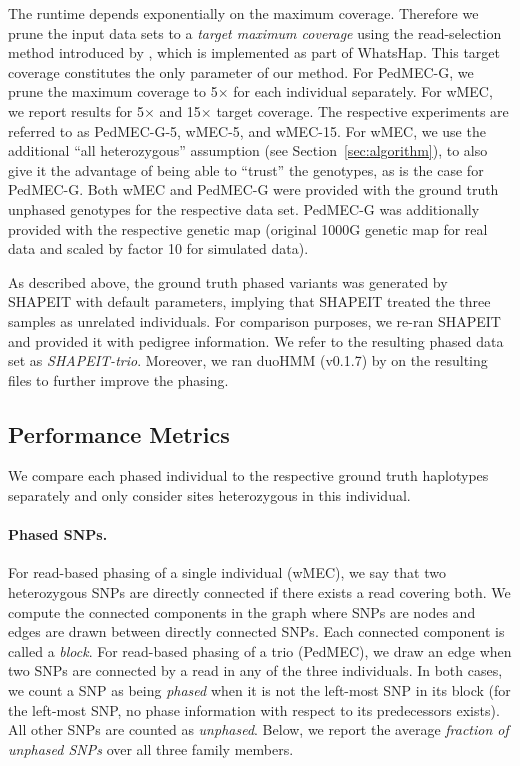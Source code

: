 The runtime depends exponentially on the maximum coverage.
Therefore we prune the input data sets to a \emph{target maximum coverage} using the read-selection method introduced by \cite{Fischer2016}, which is implemented as part of WhatsHap.
This target coverage constitutes the only parameter of our method.
For PedMEC-G, we prune the maximum coverage to 5$\times$ for each individual separately.
For wMEC, we report results for 5$\times$ and 15$\times$ target coverage.
The respective experiments are referred to as \mbox{PedMEC-G-5}, wMEC-5, and wMEC-15.
For wMEC, we use the additional ``all heterozygous'' assumption (see Section~\ref{sec:algorithm}), to also give it the advantage of being able to ``trust'' the genotypes, as is the case for PedMEC-G.
Both wMEC and PedMEC-G were provided with the ground truth unphased genotypes for the respective data set.
PedMEC-G was additionally provided with the respective genetic map (original 1000G genetic map for real data and scaled by factor 10 for simulated data).


As described above, the ground truth phased variants was generated by SHAPEIT with default parameters, implying that SHAPEIT treated the three samples as unrelated individuals.
For comparison purposes, we re-ran SHAPEIT and provided it with pedigree information.
We refer to the resulting phased data set as \emph{SHAPEIT-trio}.
Moreover, we ran duoHMM (v0.1.7) by \cite{OConnell2014} on the resulting files to further improve the phasing.

\subsection{Performance Metrics}\label{sec:metrics}
We compare each phased individual to the respective ground truth haplotypes separately and only consider sites heterozygous in this individual.

\paragraph{Phased SNPs.}
For read-based phasing of a single individual (wMEC), we say that two heterozygous SNPs are directly connected if there exists a read covering both.
We compute the connected components in the graph where SNPs are nodes and edges are drawn between directly connected SNPs.
Each connected component is called a \emph{block}.
For read-based phasing of a trio (PedMEC), we draw an edge when two SNPs are connected by a read in any of the three individuals.
In both cases, we count a SNP as being \emph{phased} when it is not the left-most SNP in its block (for the left-most SNP, no phase information with respect to its predecessors exists).
All other SNPs are counted as \emph{unphased}.
Below, we report the average \emph{fraction of unphased SNPs} over all three family members.

